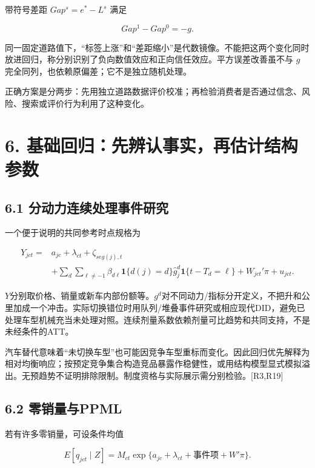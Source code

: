 \documentclass[
  11pt,
]{article}
\begin{document}
带符号差距 \(Gap^s=e^*-L^s\) 满足

\[
Gap^1-Gap^0=-g. \tag{13}
\]

同一固定道路值下，``标签上涨''和``差距缩小''是代数镜像。不能把这两个变化同时放进回归，称分别识别了负向数值效应和正向信任效应。平方误差改善虽不与
\(g\) 完全同列，也依赖原偏差；它不是独立随机处理。

正确方案是分两步：先用独立道路数据评价校准；再检验消费者是否通过信念、风险、搜索或评价行为利用了这种变化。

\section{6.
基础回归：先辨认事实，再估计结构参数}\label{ux57faux7840ux56deux5f52ux5148ux8fa8ux8ba4ux4e8bux5b9eux518dux4f30ux8ba1ux7ed3ux6784ux53c2ux6570}

\subsection{6.1
分动力连续处理事件研究}\label{ux5206ux52a8ux529bux8fdeux7eedux5904ux7406ux4e8bux4ef6ux7814ux7a76}

一个便于说明的共同参考时点规格为

\[
\begin{aligned}
Y_{jct}={}&a_{jc}+\lambda_{ct}+\zeta_{seg(j),t}\\
&+\sum_{d}\sum_{\ell\ne-1}
\beta_{d\ell}\mathbf1\{d(j)=d\}
\widehat g_j^{d}\mathbf1\{t-T_d=\ell\}
+W_{jct}'\pi+u_{jct}.
\end{aligned} \tag{14}
\]

\(Y\)分别取价格、销量或新车内部份额等。\(g^d\)对不同动力/指标分开定义，不把升和公里加成一个冲击。实际切换错位时用队列/堆叠事件研究或相应现代DID，避免已处理车型机械充当未处理对照。连续剂量系数依赖剂量可比趋势和共同支持，不是未经条件的ATT。

汽车替代意味着``未切换车型''也可能因竞争车型重标而变化。因此回归优先解释为相对均衡响应；按预定竞争集合构造竞品暴露作稳健性，或用结构模型显式模拟溢出。无预趋势不证明排除限制。制度资格与实际展示需分别检验。{[}R3,R19{]}

\subsection{6.2 零销量与PPML}\label{ux96f6ux9500ux91cfux4e0eppml}

若有许多零销量，可设条件均值

\[
E[q_{jct}\mid Z]
=M_{ct}\exp\{a_{jc}+\lambda_{ct}+\text{事件项}+W'\pi\}. \tag{15}
\]
\end{document}
